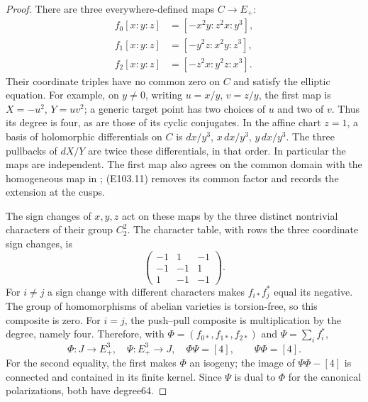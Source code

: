 \begin{proof}
There are three everywhere-defined maps $C\to E_+$:
\[
 \begin{split}
 f_0[x:y:z]&=[-x^2y:z^2x:y^3],\\
 f_1[x:y:z]&=[-y^2z:x^2y:z^3],\\
 f_2[x:y:z]&=[-z^2x:y^2z:x^3].
 \end{split}
 \tag{E103.11}
\]
Their coordinate triples have no common zero on $C$ and satisfy
the elliptic equation.  For example, on $y\ne0$, writing
$u=x/y$, $v=z/y$, the first map is $X=-u^2$, $Y=uv^2$;
a generic target point has two choices of $u$ and two of $v$.
Thus its degree is four, as are those of its cyclic conjugates.
In the affine chart $z=1$, a basis of holomorphic differentials
on $C$ is $dx/y^3$, $x\,dx/y^3$, $y\,dx/y^3$.
The three pullbacks of $dX/Y$ are twice these differentials,
in that order.  In particular the maps are independent.
The first map also agrees on the common domain with the
homogeneous map in \cite[Proposition3.1 and its proof]{E103_FiteLorenzoSutherland};
(E103.11) removes its common factor and records the extension
at the cusps.

The sign changes of $x,y,z$ act on these maps by the three
distinct nontrivial characters of their group $C_2^2$.
The character table, with rows the three coordinate sign changes,
is
\[
 \begin{pmatrix}-1&1&-1\\-1&-1&1\\1&-1&-1\end{pmatrix}.
 \tag{E103.12}
\]
For $i\ne j$ a sign change with different characters makes
$f_{i*}f_j^*$ equal its negative.  The group of homomorphisms
of abelian varieties is torsion-free, so this composite is zero.
For $i=j$, the push--pull composite is multiplication by the
degree, namely four.  Therefore, with
$\Phi=(f_{0*},f_{1*},f_{2*})$ and $\Psi=\sum_i f_i^*$,
\[
 \Phi:J\longrightarrow E_+^3,
 \quad\Psi:E_+^3\longrightarrow J,
 \quad \Phi\Psi=[4],\qquad\Psi\Phi=[4].
 \tag{E103.13}
\]
For the second equality, the first makes $\Phi$ an isogeny;
the image of $\Psi\Phi-[4]$ is connected and contained in its
finite kernel.  Since $\Psi$ is dual to $\Phi$ for the canonical
polarizations, both have degree64.


\end{proof}
